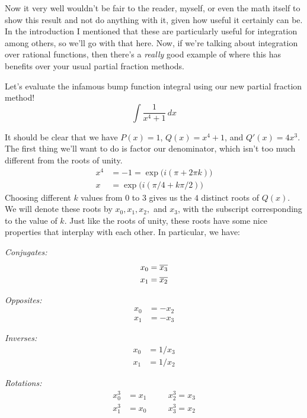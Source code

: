 Now it very well wouldn't be fair to the reader, myself, or even the math
itself to show this result and not do anything with it, given how useful it
certainly can be. In the introduction I mentioned that these are particularly
useful for integration among others, so we'll go with that here. Now, if we're
talking about integration over rational functions, then there's a
\textit{really} good example of where this has benefits over your usual partial
fraction methods.
\begin{blackbox}
\begin{problem}
    Let's evaluate the infamous bump function integral using our new partial fraction method!
    \[
        \int \frac{1}{x^4 + 1} \, dx
    \]
\end{problem}
\end{blackbox}
It should be clear that we have \( P \left( x \right) = 1 \), \( Q \left( x
\right) = x^4 + 1 \), and \( Q' \left( x \right) = 4x^3 \). The first thing we'll want to do is factor our
denominator, which isn't too much different from the roots of unity.
\begin{align*}
    x^4 &= -1 =  \exp{\bigl( i \left( \pi + 2 \pi k \right) \bigr)} \\
    x  &= \exp{\bigl( i \left( \pi / 4 + k \pi / 2  \right) \bigr)}
\end{align*}
Choosing different \( k \) values from \( 0 \) to \( 3 \) gives us the \( 4 \)
distinct roots of \( Q \left( x \right) \). We will denote these roots by \(
x_0, x_1, x_2, \) and \( x_3 \), with the subscript corresponding to the value
of \( k \). Just like the roots of unity, these roots have some nice properties that interplay with each other. In particular, we have:
\begin{multicols}{2}
    \textit{Conjugates:}
    \begin{align*}
        x_0 &= \overline{x_3} \\
        x_1 &= \overline{x_2}
    \end{align*}

    \textit{Opposites:}
    \begin{align*}
        x_0 &= -x_2 \\
        x_1 &= -x_3
    \end{align*}

    \textit{Inverses:}
    \begin{align*}
        x_0 &= 1 / x_3 \\
        x_1 &= 1 / x_2
    \end{align*}

    \textit{Rotations:}
    \begin{alignat*}{2}
        x_0^3 &= x_1 &&\quad x_2^3 = x_3 \\
        x_1^3 &= x_0 &&\quad x_3^3 = x_2
    \end{alignat*}
\end{multicols}
